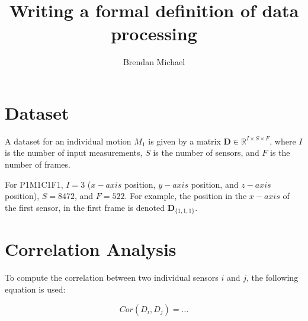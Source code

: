 \documentclass[10pt,a4paper]{article}
\author{Brendan Michael}
\title{Writing a formal definition of data processing }
\begin{document}
\maketitle

\section{Dataset}

A dataset for an individual motion $M_1$ is given by a matrix $\mathbf{D}\in\mathbb{R}^{I \times S \times F }$, where $I$ is the number of input measurements, $S$ is the number of sensors, and $F$ is the number of frames.

For P1M1C1F1, $I=3$ ($x-axis$ position, $y-axis$ position, and $z-axis$ position), $S=8472$, and $F=522$. For example, the position in the $x-axis$ of the first sensor, in the first frame is denoted $\mathbf{D}_{\{1,1,1\}}$.

\section{Correlation Analysis}

To compute the correlation between two individual sensors $i$ and $j$, the following equation is used:

\begin{equation}
Cor(D_i,D_j) = \dots
\end{equation}
\end{document}
